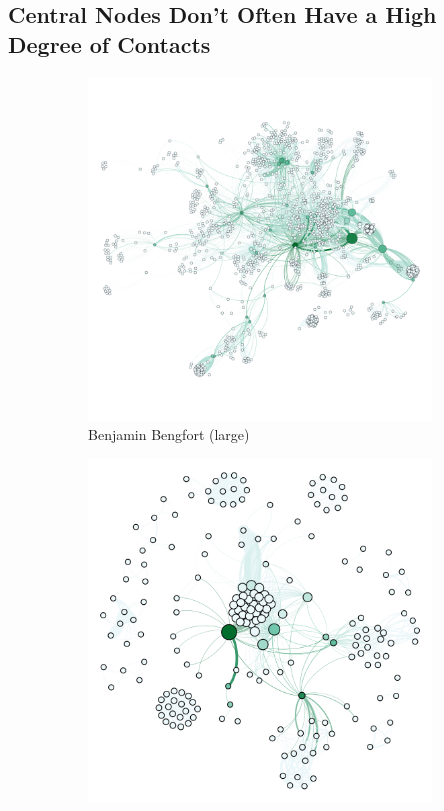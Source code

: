 \documentclass[11pt,letterpaper]{article}
\begin{document}
\subsection*{Central Nodes Don't Often Have a High Degree of Contacts}

\begin{figure}[h]
	\centering
	\begin{subfigure}{0.49\textwidth}
		\centering
		\includegraphics[width=\textwidth]{figures/benjamin_centrality.png}
		\caption{\textsf{Benjamin Bengfort (large)}}
        \label{fig:benjamin_centrality}
	\end{subfigure} \hfill
	\begin{subfigure}{0.49\textwidth}
		\centering
		\includegraphics[width=\textwidth]{figures/kostas_centrality.png}

\end{subfigure}
\end{figure}
\end{document}
